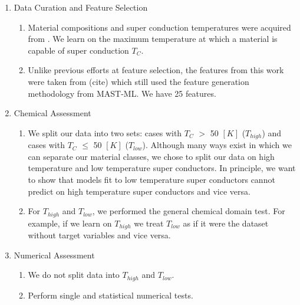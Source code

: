\begin{enumerate}
    \item Data Curation and Feature Selection

    \begin{enumerate}
        \item Material compositions and super conduction temperatures were acquired from \cite{Stanev2018}. We learn on the maximum temperature at which a material is capable of super conduction $T_{C}$.
        \item Unlike previous efforts at feature selection, the features from this work were taken from (cite) which still used the feature generation methodology from MAST-ML. We have 25 features.
    \end{enumerate}

    \item Chemical Assessment

    \begin{enumerate}
        \item We split our data into two sets: cases with $T_{C}$ $>$ 50 $[K]$ ($T_{high}$) and cases with $T_{C}$ $\leq$ 50 $[K]$ ($T_{low}$). Although many ways exist in which we can separate our material classes, we chose to split our data on high temperature and low temperature super conductors. In principle, we want to show that models fit to low temperature super conductors cannot predict on high temperature super conductors and vice versa.
        \item For $T_{high}$ and $T_{low}$, we performed the general chemical domain test. For example, if we learn on $T_{high}$ we treat $T_{low}$ as if it were the dataset without target variables and vice versa.
    \end{enumerate}

    \item Numerical Assessment

    \begin{enumerate}
        \item We do not split data into $T_{high}$ and $T_{low}$.
        \item Perform single and statistical numerical tests.
    \end{enumerate}

\end{enumerate}

